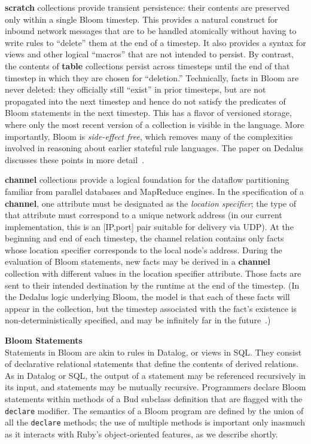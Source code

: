 {\bf scratch} collections provide transient persistence: their contents are preserved only within a single Bloom timestep.  This provides a natural construct for inbound network messages that are to be handled atomically without having to write rules to ``delete'' them at the end of a timestep.  It also provides a syntax for views and other logical ``macros'' that are not intended to persist.  By contrast, the contents of {\bf table} collections persist across timesteps until the end of that timestep in which they are chosen for ``deletion.''  Technically, facts in Bloom are never deleted: they officially still ``exist'' in prior timesteps, but are not propagated into the next timestep and hence do not satisfy the predicates of Bloom statements in the next timestep.  This has a flavor of versioned storage, where  only the most recent version of a collection is visible in the language.  More importantly, Bloom is {\em side-effect free}, which removes many of the complexities involved in reasoning about earlier stateful rule languages.  The paper on Dedalus discusses these points in more detail~\cite{dedalus-techr}.

{\bf channel} collections provide a logical foundation for the dataflow partitioning familiar from parallel databases and MapReduce engines.  In the specification of a {\bf channel}, one attribute must be designated as the {\em location specifier}; the type of that attribute must correspond to a unique network address (in our current implementation, this is an [IP,port] pair suitable for delivery via UDP).  
At the beginning and end of each timestep, the channel relation contains only facts whose location specifier corresponds to the local node's address.  During the evaluation of Bloom statements, new facts may be derived in a {\bf channel} collection with different values in the location specifier attribute.  Those facts are sent to their intended destination by the runtime at the end of the timestep.  (In the Dedalus logic underlying Bloom, the model is that each of these facts will appear in the collection, but the timestep associated with the fact's existence is non-deterministically specified, and may be infinitely far in the future~\cite{dedalus-techr}.)

{\bf Bloom Statements}\\
\noindent
Statements in Bloom are akin to rules in Datalog, or views in SQL.  They consist of declarative relational statements that define the contents of derived relations.  As in Datalog or SQL, the output of a statement may be referenced recursively in its input, and statements may be mutually recursive.  Programmers declare Bloom statements within methods of a Bud subclass definition that are flagged with the \texttt{declare} modifier.  The semantics of a Bloom program are defined by the union of all the \texttt{declare} methods; the use of multiple methods is important only inasmuch as it interacts with Ruby's object-oriented features, as we describe shortly.

